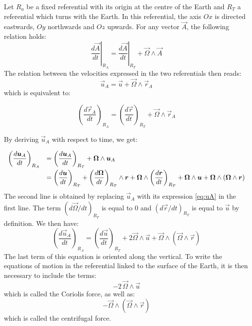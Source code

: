 Let $R_a$ be a fixed referential with its origin at the centre of the Earth and
$R_T$ a referential which turns with the Earth. In this referential, the axis $Ox$ is directed eastwards,
$Oy$ northwards and $Oz$ upwards.
For any vector $\vec{A}$, the following relation holds:
\begin{equation}
\left.\dfrac{d \vec{A}}{d t}\right|_{R_A}=\left.\dfrac{d \vec{A}}{d t}\right|_{R_T}+\vec{\Omega}\wedge\vec{A}
\end{equation}
The relation between the velocities expressed in the two referentials then reads:
\begin{equation}\label{eq:uA}
\vec{u}_{A}=\vec{u}+\vec{\Omega}\wedge\vec{r}_A
\end{equation}
which is equivalent to:%

\begin{equation}
\left(  \dfrac{d\vec{r}_A}{dt}\right)_{R_A}=\left(
\dfrac{d\vec{r}}{dt}\right)_{R_T}+\vec{\Omega
}\wedge\vec{r}_A%
\end{equation}


By deriving $\vec{u}_{A}$ with respect to time, we get:%

\begin{equation}
\begin{array}{ll}
\left(  \dfrac{d\vec{u}_{A}}{dt}\right)_{R_A}&=\left(
\dfrac{d\vec{u}_A}{dt}\right)  _{R_T}%
+\vec{\Omega}\wedge\vec{u}_A\smallskip\\
&=\left(
\dfrac{d\vec{u}}{dt}\right)_{R_T}
+\left(\dfrac{d\vec{\Omega}}{dt}\right)_{R_T}\wedge\vec{r}
+\vec{\Omega}\wedge\left(  \dfrac
{d\vec{r}}{dt}\right)_{R_T}
+\vec{\Omega}\wedge\vec{u}
+\vec{\Omega}\wedge(\vec{\Omega}\wedge\vec{r})
\end{array}
\end{equation}
The second line is obtained by replacing $\vec{u}_A$ with its expression \eqref{eq:uA} in the first line.
The term $\left(d\vec{\Omega}/dt\right)_{R_T}$ is equal to 0 and $\left(d\vec{r}/dt\right)_{R_T}$
is equal to $\vec{u}$ by definition. We then have:
\begin{equation}
\left(  \dfrac{d\vec{u}_{A}}{dt}\right)_{R_A}=
\left(\dfrac{d\vec{u}}{dt}\right)_{R_T}
+2\vec{\Omega}\wedge\vec{u}
+\vec{\Omega}\wedge(\vec{\Omega}\wedge\vec{r})
\end{equation}
The last term of this equation is oriented along the vertical.
To write the equations of motion in the referential linked to the surface of the Earth,
it is then necessary to include the terms:
\begin{equation}
-2\,\vec{\Omega}\wedge\vec{u}%
\end{equation}
which is called the Coriolis force, as well as:
\begin{equation}
-\vec{\Omega}\wedge(\vec{\Omega}\wedge\vec{r})
\end{equation}
which is called the centrifugal force.

